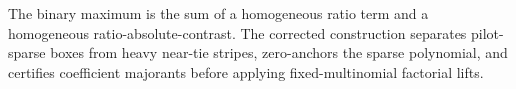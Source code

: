 The binary maximum is the sum of a homogeneous ratio term and a homogeneous ratio-absolute-contrast.  The corrected construction separates pilot-sparse boxes from heavy near-tie stripes, zero-anchors the sparse polynomial, and certifies coefficient majorants before applying fixed-multinomial factorial lifts.